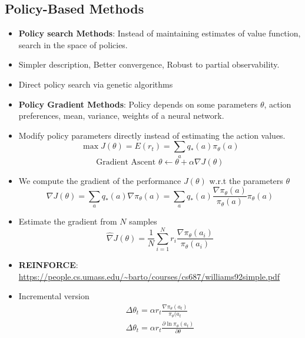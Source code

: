 \documentclass[a4paper]{article}
\begin{document}
\subsection{Policy-Based Methods}
\begin{itemize}
    \item \textbf{Policy search Methods}: Instead of maintaining estimates of value function, search in the space of policies.
    \item Simpler description, Better convergence, Robust to partial observability.
    \item Direct policy search via genetic algorithms
    \item \textbf{Policy Gradient Methods}: Policy depends on some parameters $\theta$, action preferences, mean, variance, weights of a neural network.
    \item Modify policy parameters directly instead of estimating the action values.
    \begin{equation*}
        \max J(\theta)=E(r_t)=\sum_aq_*(a)\pi_{\theta}(a)
    \end{equation*}
    \begin{equation*}
        \text{Gradient Ascent }\theta \gets \theta + \alpha \nabla J(\theta)
    \end{equation*}
    \item We compute the gradient of the performance $J(\theta)$ w.r.t the parameters $\theta$
    \begin{equation*}
        \nabla J(\theta)=\sum_aq_*(a)\nabla \pi_{\theta}(a)=\sum_aq_*(a)\frac{\nabla \pi_{\theta}(a)}{\pi_{\theta}(a)}\pi_{\theta}(a)
    \end{equation*}
    \item Estimate the gradient from $N$ samples
    \begin{equation*}
        \hat{\nabla}J(\theta)=\frac{1}{N}\sum_{i=1}^Nr_i\frac{\nabla \pi_{\theta}(a_i)}{\pi_{\theta}(a_i)}
    \end{equation*}
    \item \textbf{REINFORCE}: \url{https://people.cs.umass.edu/~barto/courses/cs687/williams92simple.pdf}
    \item Incremental version
    \begin{equation*}
        \begin{split}
            \Delta \theta_t=\alpha r_t\frac{\nabla \pi_\theta(a_t)}{\pi_\theta(a_t}\\
            \Delta \theta_t=\alpha r_t\frac{\partial \ln{\pi_\theta(a_t)}}{\partial \theta}
        \end{split}

\end{equation*}
\end{itemize}
\end{document}
